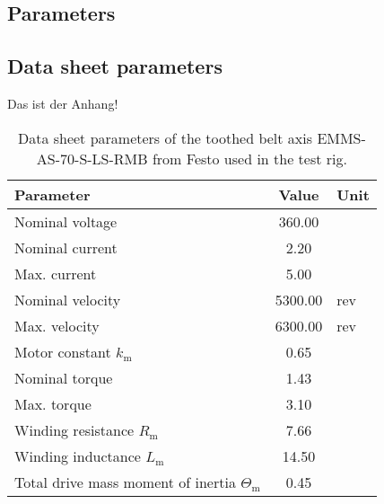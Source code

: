 \begin{appendices}
	
\chapter{Parameters}
\label{apx:AppendixA}
\section{Data sheet parameters}
Das ist der Anhang!
\begin{table}[htbp!]
	\caption[Data sheet parameters of the toothed belt axis EMMS-AS-$70$-S-LS-RMB from Festo used in the test rig.]{Data sheet parameters of the toothed belt axis EMMS-AS-$70$-S-LS-RMB \cite{EMMS_manual} from Festo used in the test rig.}
	\label{tab:Motor}
	\begin{center}
		\begin{tabular}{lS[table-format=4.3]s[table-unit-alignment=left]}
			\toprule
			Parameter & {Value} & {Unit}\\
			\midrule
			Nominal voltage &360.00&\volt\\
			Nominal current & 2.20 & \ampere\\
			Max. current & 5.00 & \ampere\\
			Nominal velocity & 5300.00 & {rev}\per\minute\\
			Max. velocity & 6300.00 & {rev}\per\minute\\
			Motor constant $k_\text{m}$&0.65&\newton\meter\per\ampere\\
			Nominal torque &1.43&\newton\meter \\
			Max. torque &3.10&\newton\meter \\
			Winding resistance $R_\text{m}$&7.66&\ohm\\
			Winding inductance $L_\text{m}$&14.50&\milli\henry\\
			Total drive mass moment of inertia $\Theta_\text{m}$&0.45&\kilogram\per\centi\meter\squared\\
			\bottomrule
		\end{tabular}
	\end{center}
\end{table}
\end{appendices}
